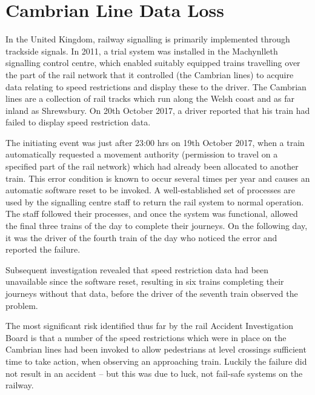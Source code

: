\section{Cambrian Line Data Loss} \label{bkm:incacc:cambrian}

In the United Kingdom, railway signalling is primarily implemented through trackside signals. In 2011, a trial system was installed in the Machynlleth signalling control centre, which enabled suitably equipped trains travelling over the part of the rail network that it controlled (the Cambrian lines) to acquire data relating to speed restrictions and display these to the driver. The Cambrian lines are a collection of rail tracks which run along the Welsh coast and as far inland as Shrewsbury. On 20th October 2017, a driver reported that his train had failed to display speed restriction data.

The initiating event was just after 23:00 hrs on 19th October 2017, when a train automatically requested a movement authority (permission to travel on a specified part of the rail network) which had already been allocated to another train. This error condition is known to occur several times per year and causes an automatic software reset to be invoked. A well-established set of processes are used by the signalling centre staff to return the rail system to normal operation. The staff followed their processes, and once the system was functional, allowed the final three trains of the day to complete their journeys. On the following day, it was the driver of the fourth train of the day who noticed the error and reported the failure.

Subsequent investigation revealed that speed restriction data had been unavailable since the software reset, resulting in six trains completing their journeys without that data, before the driver of the seventh train observed the problem. 

The most significant risk identified thus far by the rail Accident Investigation Board is that a number of the speed restrictions which were in place on the Cambrian lines had been invoked to allow pedestrians at level crossings sufficient time to take action, when observing an approaching train. Luckily the failure did not result in an accident -- but this was due to luck, not fail-safe systems on the railway.

